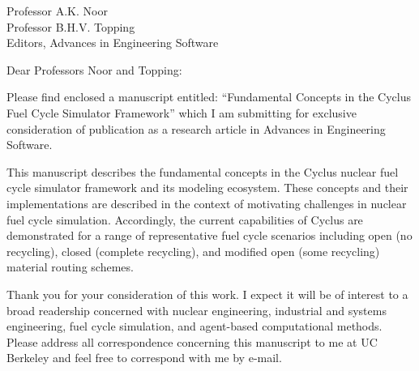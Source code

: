 \documentclass[11pt]{letter} %
\begin{document}


\begin{letter}{Professor A.K. Noor\\
Professor B.H.V. Topping\\
Editors, Advances in Engineering Software}

\address{Kathryn D. Huff\\
2150 Shattuck Ave.\\
Suite 230\\
Berkeley, CA 94720}



\opening{Dear Professors Noor and Topping:}

Please find enclosed a manuscript entitled: ``Fundamental Concepts in the 
Cyclus Fuel Cycle Simulator Framework'' which I am submitting for exclusive 
consideration of publication as a research article in Advances in Engineering 
Software.

This manuscript describes the fundamental concepts in the Cyclus nuclear fuel 
cycle simulator framework and its modeling ecosystem. These concepts and their 
implementations are described in the context of motivating challenges in 
nuclear fuel cycle simulation. Accordingly, the current capabilities of Cyclus 
are demonstrated for a range of representative fuel cycle scenarios including 
open (no recycling), closed (complete recycling), and modified open (some 
recycling) material routing schemes.


Thank you for your consideration of this work. I expect it will be of interest
to a broad readership concerned with nuclear engineering, industrial and 
systems engineering, fuel cycle simulation, and agent-based computational 
methods. Please address all correspondence concerning this manuscript to me at 
UC Berkeley and feel free to correspond with me by e-mail.  


\end{letter}
\end{document}
